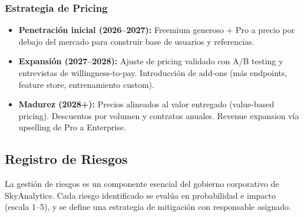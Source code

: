 ﻿\documentclass[11pt, letterpaper]{article}
\begin{document}
\subsubsection{Estrategia de Pricing}



\begin{itemize}[leftmargin=1.5cm, label=\textbullet, itemsep=2pt, topsep=4pt]

    \item \textbf{Penetración inicial (2026--2027):} Freemium generoso + Pro a precio por debajo del mercado para construir base de usuarios y referencias.

    \item \textbf{Expansión (2027--2028):} Ajuste de pricing validado con A/B testing y entrevistas de willingness-to-pay. Introducción de add-ons (más endpoints, feature store, entrenamiento custom).

    \item \textbf{Madurez (2028+):} Precios alineados al valor entregado (value-based pricing). Descuentos por volumen y contratos anuales. Revenue expansion vía upselling de Pro a Enterprise.

\end{itemize}



\subsection{Registro de Riesgos}



La gestión de riesgos es un componente esencial del gobierno corporativo de SkyAnalytics. Cada riesgo identificado se evalúa en probabilidad e impacto (escala 1--5), y se define una estrategia de mitigación con responsable asignado.
\end{document}
